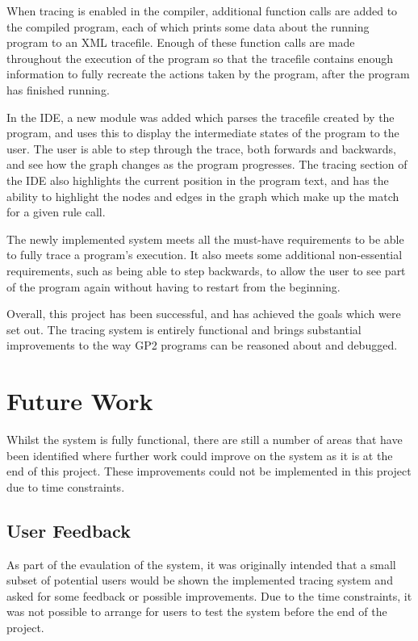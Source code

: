 \documentclass[authoryearcitations]{UoYCSproject}
\begin{document}
When tracing is enabled in the compiler, additional function calls are added to
the compiled program, each of which prints some data about the running program
to an XML tracefile. Enough of these function calls are made throughout the
execution of the program so that the tracefile contains enough information to
fully recreate the actions taken by the program, after the program has finished
running.

In the IDE, a new module was added which parses the tracefile created by the
program, and uses this to display the intermediate states of the program to the
user. The user is able to step through the trace, both forwards and backwards,
and see how the graph changes as the program progresses. The tracing section of
the IDE also highlights the current position in the program text, and has the
ability to highlight the nodes and edges in the graph which make up the match
for a given rule call.

The newly implemented system meets all the must-have requirements to be able to
fully trace a program's execution. It also meets some additional non-essential
requirements, such as being able to step backwards, to allow the user to see
part of the program again without having to restart from the beginning.

Overall, this project has been successful, and has achieved the goals which were
set out. The tracing system is entirely functional and brings substantial
improvements to the way GP2 programs can be reasoned about and debugged.



\section{Future Work}
\label{sec:FutureWork}

Whilst the system is fully functional, there are still a number of areas that
have been identified where further work could improve on the system as it is at
the end of this project. These improvements could not be implemented in this
project due to time constraints.

\subsection{User Feedback}
\label{sec:UserFeedback}

As part of the evaulation of the system, it was originally intended that a small
subset of potential users would be shown the implemented tracing system and asked
for some feedback or possible improvements. Due to the time constraints, it was
not possible to arrange for users to test the system before the end of the project.
\end{document}
